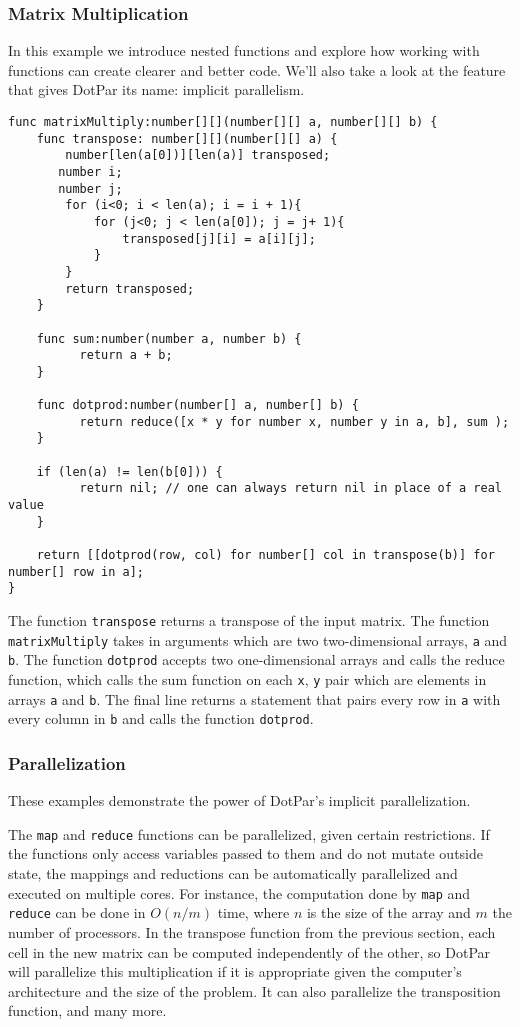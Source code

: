 \documentclass{article}
\begin{document}
\subsubsection{Matrix Multiplication}
In this example we introduce nested functions and explore how working with functions can create clearer and better code. We’ll also take a look at the feature that gives DotPar its name: implicit parallelism.

\begin{verbatim}
func matrixMultiply:number[][](number[][] a, number[][] b) {
    func transpose: number[][](number[][] a) {
        number[len(a[0])][len(a)] transposed;
       number i;
       number j;
        for (i<0; i < len(a); i = i + 1){
            for (j<0; j < len(a[0]); j = j+ 1){
                transposed[j][i] = a[i][j];
            }
        }
        return transposed;
    }

    func sum:number(number a, number b) {
          return a + b;
    }
    
    func dotprod:number(number[] a, number[] b) {
          return reduce([x * y for number x, number y in a, b], sum );
    }
    
    if (len(a) != len(b[0])) {
          return nil; // one can always return nil in place of a real value
    }
    
    return [[dotprod(row, col) for number[] col in transpose(b)] for number[] row in a];
}
\end{verbatim}

The function \verb!transpose! returns a transpose of the input matrix. The function \verb!matrixMultiply! takes in arguments which are two two-dimensional arrays, \verb!a! and \verb!b!. The function \verb!dotprod! accepts two one-dimensional arrays and calls the reduce function, which calls the sum function on each \verb!x!, \verb!y! pair which are elements in arrays \verb!a! and \verb!b!. The final line returns a statement that pairs every row in \verb!a! with every column in \verb!b! and calls the function \verb!dotprod!.

\subsubsection{Parallelization}
These examples demonstrate the power of DotPar’s implicit parallelization.

The \verb!map! and \verb!reduce! functions can be parallelized, given certain restrictions. If the functions only access variables passed to them and do not mutate outside state, the mappings and reductions can be automatically parallelized and executed on multiple cores. For instance, the computation done by \verb!map! and \verb!reduce! can be done in $O(n/m)$ time, where $n$ is the size of the array and $m$ the number of processors. In the transpose function from the previous section, each cell in the new matrix can be computed independently of the other, so DotPar will parallelize this multiplication if it is appropriate given the computer’s architecture and the size of the problem. It can also parallelize the transposition function, and many more.
\end{document}
